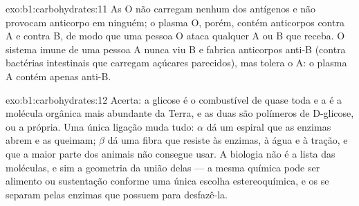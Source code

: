 \begin{solution}{exo:b1:carbohydrates:11}
As  O não carregam nenhum dos antígenos e não provocam anticorpo
em ninguém; o plasma O, porém, contém anticorpos contra A e contra B, de
modo que uma pessoa O ataca qualquer  A ou B que receba. O sistema
imune de uma pessoa A nunca viu B e fabrica anticorpos anti-B (contra
bactérias intestinais que carregam açúcares parecidos), mas tolera o A:
o plasma A contém apenas anti-B.
\end{solution}

\begin{solution}{exo:b1:carbohydrates:12}
Acerta: a glicose é o combustível de quase toda  e a  é a
molécula orgânica mais abundante da Terra, e as duas são polímeros de
D-glicose, ou a própria. Uma única ligação muda tudo: $\alpha$ dá um
espiral que as enzimas abrem e as  queimam; $\beta$ dá uma fibra
que resiste às enzimas, à água e à tração, e que a maior parte dos
animais não consegue usar. A biologia não é a lista das moléculas, e sim
a geometria da união delas --- a mesma química pode ser alimento ou
sustentação conforme uma única escolha estereoquímica, e os 
se separam pelas enzimas que possuem para desfazê-la.
\end{solution}


